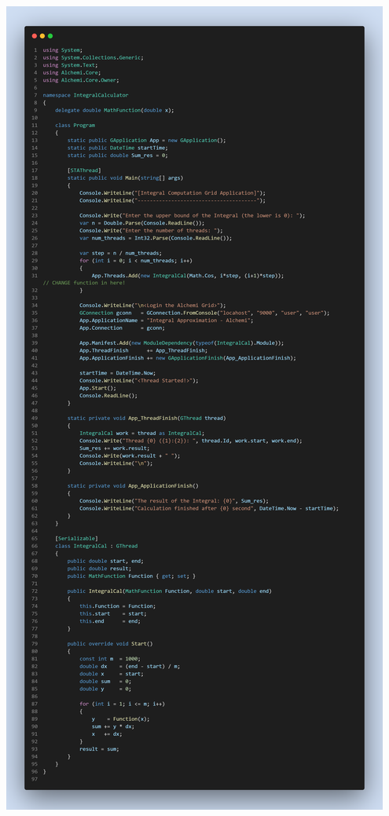 \documentclass[12pt,a4paper]{report}
\begin{document}
\begin{center}
\clearpage
\includegraphics[trim=0in 0in 0in 19.1in, clip, scale=.23]{./Figures/IntegralCalculator/IntegralCalculator}
\clearpage
\end{center}
\end{document}
